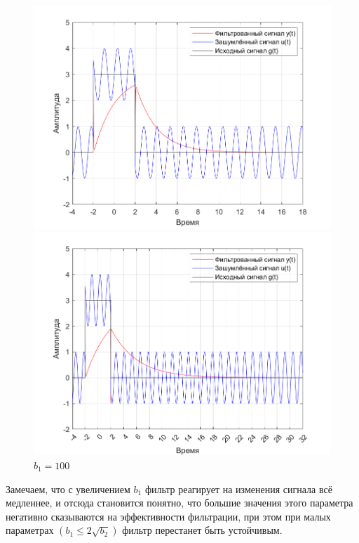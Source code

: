 \documentclass[a4paper]{article}
\begin{document}
\begin{figure}[H]
    \begin{minipage}{0.5\textwidth}
        \centering
        \includegraphics[width=\linewidth]{ex1_2/a1=0_a2=25_b1=50_b2=25_d=5/h2.png}
        \caption{$b_1=50$}
    \end{minipage}
    \begin{minipage}{0.5\textwidth}
        \centering
        \includegraphics[width=\linewidth]{ex1_2/a1=0_a2=25_b1=100_b2=25_d=5/h2.png}
        \caption{$b_1=100$}
    \end{minipage}
\end{figure}

Замечаем, что с увеличением $b_1$ фильтр реагирует на изменения сигнала всё медленнее, и отсюда становится понятно, что большие значения этого параметра негативно сказываются на эффективности фильтрации, при этом при малых параметрах $(b_1 \leq 2\sqrt{b_2})$ фильтр перестанет быть устойчивым.
\end{document}
